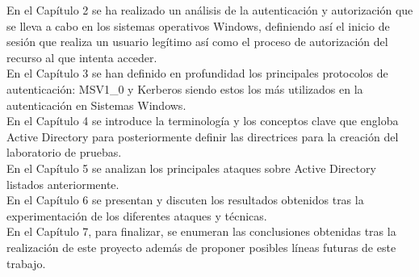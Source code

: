 En el Capítulo 2 se ha realizado un análisis de la autenticación y autorización que se lleva a cabo en los sistemas operativos Windows, definiendo así el inicio de sesión que realiza un usuario legítimo así como el proceso de autorización del recurso al que intenta acceder. \\

En el Capítulo 3 se han definido en profundidad los principales protocolos de au\-ten\-ti\-ca\-ción: MSV1\_0 y Kerberos siendo estos los más utilizados en la au\-ten\-ti\-ca\-ción en Sistemas Windows. \\

En el Capítulo 4 se introduce la terminología y los conceptos clave que engloba Active Directory para posteriormente definir las directrices para la creación del laboratorio de pruebas. \\

En el Capítulo 5 se analizan los principales ataques sobre Active Directory listados anteriormente. \\

En el Capítulo 6 se presentan y discuten los resultados obtenidos tras la ex\-pe\-ri\-men\-ta\-ción de los diferentes ataques y técnicas. \\

En el Capítulo 7, para finalizar, se enumeran las conclusiones obtenidas tras la re\-a\-li\-za\-ción de este proyecto además de proponer posibles líneas futuras de este trabajo. \\



